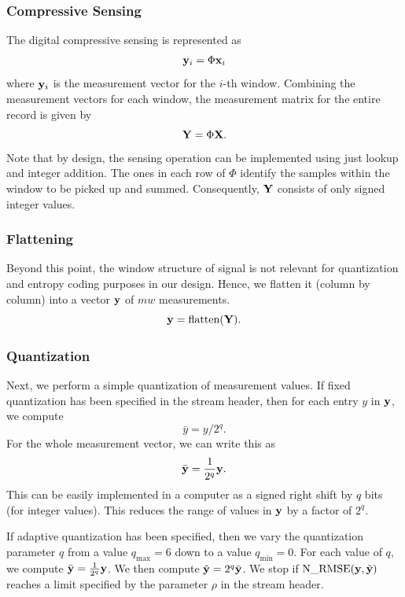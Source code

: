 \subsubsection{Compressive Sensing}
The digital compressive sensing
is represented as
\begin{equation}
\mathbf{y}_i = \Phi \mathbf{x}_i
\end{equation}
where $\mathbf{y}_i$ is the measurement vector for the $i$-th
window. Combining the measurement vectors for each window,
the measurement matrix for the entire record is given by
\begin{equation}
\mathbf{Y} = \Phi \mathbf{X}.
\end{equation}
Note that by design, the sensing operation can be implemented
using just lookup and integer addition. The ones
in each row of $\Phi$ identify the samples within the window
to be picked up and summed. Consequently, $\mathbf{Y}$ consists of
only signed integer values.

\subsubsection{Flattening}
Beyond this point, the window structure of signal is not
relevant for quantization and entropy coding purposes in our design.
Hence, we flatten it (column by column) into a vector
$\mathbf{y}$ of $m w$ measurements.
\begin{equation}
\mathbf{y} = \text{flatten}(\mathbf{Y}).
\end{equation}

\subsubsection{Quantization}
Next, we perform a simple quantization of measurement values.
If fixed quantization has been specified in the stream header,
then for each entry $y$ in $\mathbf{y}$, we compute
\begin{equation}
\bar{y} = y / 2^q.
\end{equation}
For the whole measurement vector, we can write this as
\begin{equation}
\bar{\mathbf{y}} = \frac{1}{2^q} \mathbf{y}.
\end{equation}
This can be easily implemented in a computer as a signed
right shift by $q$ bits (for integer values).
This reduces the range of values in $\mathbf{y}$ by a factor of $2^q$.

If adaptive quantization has been specified, then we vary
the quantization parameter $q$ from a value $q_{\max}=6$
down to a value $q_{\min}=0$. For each value of $q$,
we compute $\bar{\mathbf{y}} = \frac{1}{2^q} \mathbf{y}$. We then
compute $\tilde{\mathbf{y}} = 2^q \bar{\mathbf{y}}$. We stop
if $\mathrm{N\_RMSE}(\mathbf{y}, \tilde{\mathbf{y}})$ reaches a limit specified by
the parameter $\rho$ in the stream header.

